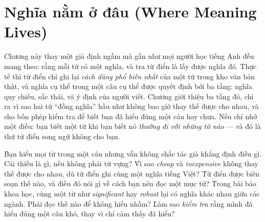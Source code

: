 \documentclass[../../english.tex]{subfiles}
\begin{document}
\chapter{Nghĩa nằm ở đâu (Where Meaning Lives)}

\begin{tomtat}
Chương này thay một giả định ngầm mà gần như mọi người học tiếng Anh đều mang theo: rằng mỗi từ có một nghĩa, và tra từ điển là lấy được nghĩa đó. Thực tế thì từ điển chỉ ghi lại \emph{cách dùng phổ biến nhất} của một từ trong kho văn bản thật, và nghĩa cụ thể trong một câu cụ thể được quyết định bởi ba tầng: nghĩa quy chiếu, sắc thái, và ý định của người viết. Chương giới thiệu ba tầng đó, chỉ ra vì sao hai từ ``đồng nghĩa'' hầu như không bao giờ thay thế được cho nhau, và cho bốn phép kiểm tra để biết bạn đã hiểu đúng một câu hay chưa. Nếu chỉ nhớ một điều: bạn biết một từ khi bạn biết nó \emph{thường đi với những từ nào} --- và đó là thứ từ điển song ngữ không cho bạn.
\end{tomtat}

\begin{nentang}
\end{nentang}

\begin{khoigoi}
\h{Bạn hiểu mọi từ trong một câu nhưng vẫn không chắc tác giả khẳng định điều gì. Cái thiếu là gì, nếu không phải từ vựng?}
\h{Vì sao \emph{cheap} và \emph{inexpensive} không thay thế được cho nhau, dù từ điển ghi cùng một nghĩa tiếng Việt?}
\h{Từ điển được biên soạn thế nào, và điều đó nói gì về cách bạn nên đọc một mục từ?}
\h{Trong bài báo khoa học, cùng một từ như \emph{significant} hay \emph{robust} lại có nghĩa khác nhau giữa các ngành. Phải đọc thế nào để không hiểu nhầm?}
\h{Làm sao \emph{kiểm tra} rằng mình đã hiểu đúng một câu khó, thay vì chỉ cảm thấy đã hiểu?}
\end{khoigoi}
\end{document}
